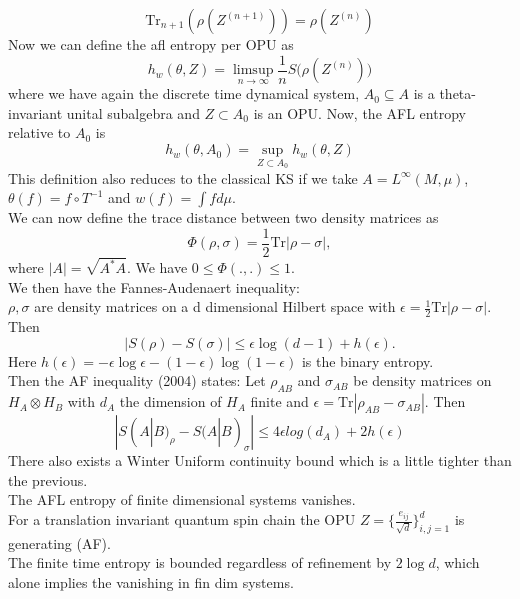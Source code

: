 \documentclass{article}
\begin{document}
\begin{equation}
    \text{Tr}_{n+1}(\rho(Z^{(n+1)})) = \rho(Z^{(n)})
\end{equation}
Now we can define the afl entropy per OPU as 
\begin{equation}
    h_w(\theta, Z) = \limsup_{n\to\infty}{\frac{1}{n}S(\rho(Z^{(n)})})
\end{equation}
where we have again the discrete time dynamical system, $A_0\subseteq A$ is a theta-invariant unital subalgebra and $Z\subset A_0$ is an OPU. Now, the AFL entropy relative to $A_0$ is
\begin{equation}
    h_w(\theta, A_0) = \sup_{Z\subset A_0}h_w(\theta,Z)
\end{equation} 
This definition also reduces to the classical KS if we take $A = L^\infty(M,\mu)$, $\theta(f) = f\circ T^{-1}$ and $w(f) = \int f d\mu$.\\

We can now define the trace distance between two density matrices as 
\begin{equation}
    \Phi(\rho,\sigma) = \frac{1}{2}\text{Tr}|\rho-\sigma|,
\end{equation}
where $|A| = \sqrt{A^*A}$. We have $0\leq \Phi(.,.) \leq 1$. \\
We then have the Fannes-Audenaert inequality:\\
$\rho, \sigma$ are density matrices on a d dimensional Hilbert space with $\epsilon = \frac{1}{2}\text{Tr}|\rho-\sigma|$. Then
\begin{equation}
    |S(\rho) - S(\sigma)| \leq \epsilon \log(d-1) + h (\epsilon). 
\end{equation}
Here $h(\epsilon) = -\epsilon\log \epsilon - (1-\epsilon)\log(1-\epsilon) $ is the binary entropy.\\
Then the AF inequality (2004) states: Let $\rho_{AB}$ and $\sigma_{AB}$ be density matrices on $H_A \otimes H_B$ with $d_A$ the dimension of $H_A$ finite and $\epsilon = \text{Tr}|\rho_{AB}-\sigma_{AB}|$. Then
\begin{equation}
    |S(A|B)_\rho- S(A|B)_\sigma| \leq 4\epsilon log(d_A) + 2h(\epsilon)
\end{equation}
There also exists a Winter Uniform continuity bound which is a little tighter than the previous. \\

The AFL entropy of finite dimensional systems vanishes.\\
For a translation invariant quantum spin chain the OPU $Z = \{\frac{e_{ij}}{\sqrt{d}}\}_{i,j =1}^d$ is generating (AF). \\
The finite time entropy is bounded regardless of refinement by $2 \log d $, which alone implies the vanishing in fin dim systems.  \\
\end{document}
